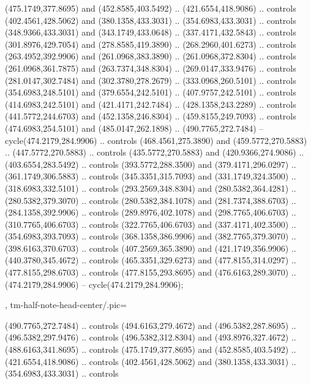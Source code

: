 {{\begin{scope}[y=-0.80pt,x=0.80pt,scale=0.038,yshift=270pt,xshift=-482pt]
        (475.1749,377.8695) and (452.8585,403.5492) .. (421.6554,418.9086) .. controls
        (402.4561,428.5062) and (380.1358,433.3031) .. (354.6983,433.3031) .. controls
        (348.9366,433.3031) and (343.1749,433.0648) .. (337.4171,432.5843) .. controls
        (301.8976,429.7054) and (278.8585,419.3890) .. (268.2960,401.6273) .. controls
        (263.4952,392.9906) and (261.0968,383.3890) .. (261.0968,372.8304) .. controls
        (261.0968,361.7875) and (263.7374,348.8304) .. (269.0147,333.9476) .. controls
        (281.0147,302.7484) and (302.3780,278.2679) .. (333.0968,260.5101) .. controls
        (354.6983,248.5101) and (379.6554,242.5101) .. (407.9757,242.5101) .. controls
        (414.6983,242.5101) and (421.4171,242.7484) .. (428.1358,243.2289) .. controls
        (441.5772,244.6703) and (452.1358,246.8304) .. (459.8155,249.7093) .. controls
        (474.6983,254.5101) and (485.0147,262.1898) .. (490.7765,272.7484) --
        cycle(474.2179,284.9906) .. controls (468.4561,275.3890) and
        (459.5772,270.5883) .. (447.5772,270.5883) .. controls (435.5772,270.5883) and
        (420.9366,274.9086) .. (403.6554,283.5492) .. controls (393.5772,288.3500) and
        (379.4171,296.0297) .. (361.1749,306.5883) .. controls (345.3351,315.7093) and
        (331.1749,324.3500) .. (318.6983,332.5101) .. controls (293.2569,348.8304) and
        (280.5382,364.4281) .. (280.5382,379.3070) .. controls (280.5382,384.1078) and
        (281.7374,388.6703) .. (284.1358,392.9906) .. controls (289.8976,402.1078) and
        (298.7765,406.6703) .. (310.7765,406.6703) .. controls (322.7765,406.6703) and
        (337.4171,402.3500) .. (354.6983,393.7093) .. controls (368.1358,386.9906) and
        (382.7765,379.3070) .. (398.6163,370.6703) .. controls (407.2569,365.3890) and
        (421.1749,356.9906) .. (440.3780,345.4672) .. controls (465.3351,329.6273) and
        (477.8155,314.0297) .. (477.8155,298.6703) .. controls (477.8155,293.8695) and
        (476.6163,289.3070) .. (474.2179,284.9906) -- cycle(474.2179,284.9906);
    \end{scope}
  },
  tm-half-note-head-center/.pic={
    \begin{scope}[y=-0.80pt,x=0.80pt,scale=0.038,yshift=270pt,xshift=-303pt]
       (490.7765,272.7484) .. controls
        (494.6163,279.4672) and (496.5382,287.8695) .. (496.5382,297.9476) .. controls
        (496.5382,312.8304) and (493.8976,327.4672) .. (488.6163,341.8695) .. controls
        (475.1749,377.8695) and (452.8585,403.5492) .. (421.6554,418.9086) .. controls
        (402.4561,428.5062) and (380.1358,433.3031) .. (354.6983,433.3031) .. controls

\end{scope}}}
